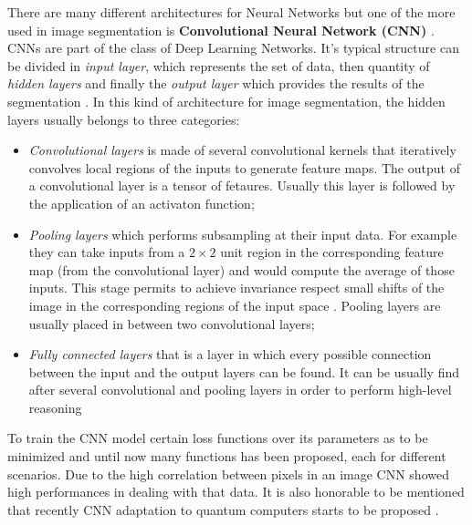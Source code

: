 \documentclass{standalone}
\begin{document}
There are many different architectures for Neural Networks but one of the more used in image segmentation is \textbf{Convolutional Neural Network (CNN)} \cite{mastersthesis:Biondi}.
CNNs are part of the class of Deep Learning Networks. It's typical structure can be divided in \textit{input layer}, which represents the set of data, then quantity of \textit{hidden layers} and finally the \textit{output layer} which provides the results of the segmentation \cite{mastersthesis:Filitto}.
In this kind of architecture for image segmentation, the hidden layers usually belongs to three categories:
\begin{itemize}
    \item \textit{Convolutional layers} is made of several convolutional kernels that iteratively convolves local regions of the inputs to generate feature maps. The output of a convolutional layer is a tensor of fetaures. Usually this layer is followed by the application of an activaton function;
    
    \item \textit{Pooling layers} which performs subsampling at their input data. For example they can take inputs from a $2 \times 2$ unit region in the corresponding feature map (from the convolutional layer) and would compute the average of those inputs. This stage permits to achieve invariance respect small shifts of the image in the corresponding regions of the input space \cite{Bishop}. Pooling layers are usually placed in between two convolutional layers;
    
    \item \textit{Fully connected layers} that is a layer in which every possible connection between the input and the output layers can be found. It can be usually find after several convolutional and pooling layers in order to perform high-level reasoning
\end{itemize} 
To train the CNN model certain loss functions over its parameters as to be minimized and until now many functions has been proposed, each for different scenarios.
Due to the high correlation between pixels in an image CNN showed high performances in dealing with that data.
It is also honorable to be mentioned that recently CNN adaptation to quantum computers starts to be proposed \cite{ART:Huang}.
\end{document}
